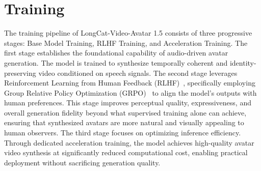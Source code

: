 \section{Training}

The training pipeline of LongCat-Video-Avatar 1.5 consists of three 
progressive stages: Base Model Training, RLHF Training, 
and Acceleration Training.  
The first stage establishes the foundational capability of audio-driven 
avatar generation. The model is trained to synthesize temporally coherent 
and identity-preserving video conditioned on speech signals. 
The second stage leverages Reinforcement Learning from Human Feedback 
(RLHF)~\cite{ouyang2022training}, specifically employing Group Relative 
Policy Optimization (GRPO)~\cite{shao2024deepseekmath} to align the 
model's outputs with human preferences. This stage improves perceptual 
quality, expressiveness, and overall generation fidelity beyond what 
supervised training alone can achieve, ensuring that synthesized avatars 
are more natural and visually appealing to human observers.
The third stage focuses on optimizing inference efficiency. Through 
dedicated acceleration training, the model achieves high-quality avatar 
video synthesis at significantly reduced computational cost, enabling 
practical deployment without sacrificing generation quality.

